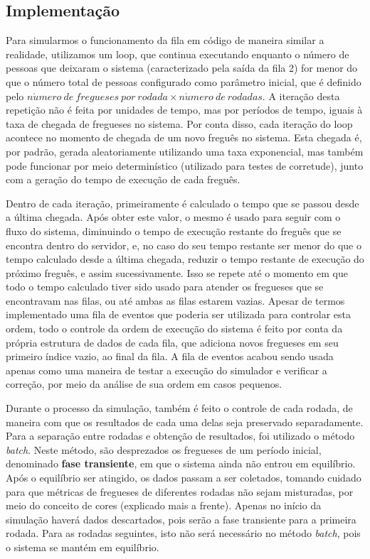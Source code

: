 \documentclass[a4paper,12pt]{report}
\begin{document}
\subsection{Implementação}

Para simularmos o funcionamento da fila em código de maneira similar a realidade, utilizamos um loop, que continua executando enquanto o número de pessoas que deixaram o sistema (caracterizado pela saída da fila 2) for menor do que o número total de pessoas configurado como parâmetro inicial, que é definido pelo $n\acute{u}mero \ de \ fregueses \ por \ rodada \times n\acute{u}mero \ de \ rodadas$. A iteração desta repetição não é feita por unidades de tempo, mas por períodos de tempo, iguais à taxa de chegada de fregueses no sistema. Por conta disso, cada iteração do loop acontece no momento de chegada de um novo freguês no sistema. Esta chegada é, por padrão, gerada aleatoriamente utilizando uma taxa exponencial, mas também pode funcionar por meio determinístico (utilizado para testes de corretude), junto com a geração do tempo de execução de cada freguês.

Dentro de cada iteração, primeiramente é calculado o tempo que se passou desde a última chegada. Após obter este valor, o mesmo é usado para seguir com o fluxo do sistema, diminuindo o tempo de execução restante do freguês que se encontra dentro do servidor, e, no caso do seu tempo restante ser menor do que o tempo calculado desde a última chegada, reduzir o tempo restante de execução do próximo freguês, e assim sucessivamente. Isso se repete até o momento em que todo o tempo calculado tiver sido usado para atender os fregueses que se encontravam nas filas, ou até ambas as filas estarem vazias. Apesar de termos implementado uma fila de eventos que poderia ser utilizada para controlar esta ordem, todo o controle da ordem de execução do sistema é feito por conta da própria estrutura de dados de cada fila, que adiciona novos fregueses em seu primeiro índice vazio, ao final da fila. A fila de eventos acabou sendo usada apenas como uma maneira de testar a execução do simulador e verificar a correção, por meio da análise de sua ordem em casos pequenos.

Durante o processo da simulação, também é feito o controle de cada rodada, de maneira com que os resultados de cada uma delas seja preservado separadamente. Para a separação entre rodadas e obtenção de resultados, foi utilizado o método \emph{batch}. Neste método, são desprezados os fregueses de um período inicial, denominado \textbf{fase transiente}, em que o sistema ainda não entrou em equilíbrio. Após o equilíbrio ser atingido, os dados passam a ser coletados, tomando cuidado para que métricas de fregueses de diferentes rodadas não sejam misturadas, por meio do conceito de cores (explicado mais a frente). Apenas no início da simulação haverá dados descartados, pois serão a fase transiente para a primeira rodada. Para as rodadas seguintes, isto não será necessário no método \emph{batch}, pois o sistema se mantém em equilíbrio.
\end{document}
